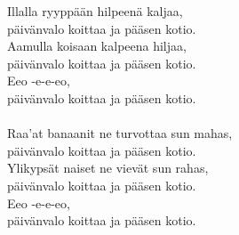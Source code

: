 
            Illalla ryyppään hilpeenä kaljaa, \\
            päivänvalo koittaa ja pääsen kotio. \\
            Aamulla koisaan kalpeena hiljaa, \\
            päivänvalo koittaa ja pääsen kotio. \\
            Eeo -e-e-eo, \\
            päivänvalo koittaa ja pääsen kotio. \\
\hspace{10mm} \\
            Raa’at banaanit ne turvottaa sun mahas, \\
            päivänvalo koittaa ja pääsen kotio. \\
            Ylikypsät naiset ne vievät sun rahas, \\
            päivänvalo koittaa ja pääsen kotio. \\
            Eeo -e-e-eo, \\
            päivänvalo koittaa ja pääsen kotio. \\
